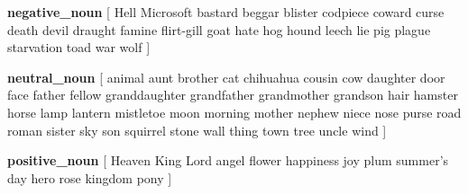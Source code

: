 \documentclass[a0paper,fontscale=0.285]{baposter} %
\begin{document}
\begin{poster}
{\textbf{negative\_noun} {[  Hell   
	 Microsoft   
	 bastard   
	 beggar   
	 blister   
	 codpiece   
	 coward   
	 curse   
	 death   
	 devil   
	 draught   
	 famine   
	 flirt-gill   
	 goat   
	 hate   
	 hog   
	 hound   
	 leech   
	 lie   
	 pig   
	 plague   
	 starvation   
	 toad   
	 war   
	 wolf  ]}

\textbf{neutral\_noun} {[  animal   
	 aunt   
	 brother   
	 cat   
	 chihuahua   
	 cousin   
	 cow   
	 daughter   
	 door   
	 face   
	 father   
	 fellow   
	 granddaughter   
	 grandfather   
	 grandmother   
	 grandson   
	 hair   
	 hamster   
	 horse   
	 lamp   
	 lantern   
	 mistletoe   
	 moon   
	 morning   
 	mother   
	 nephew   
	 niece   
	 nose   
	 purse   
	 road   
	 roman   
	 sister   
	 sky   
	 son   
	 squirrel   
	 stone   
	 wall   
	 thing   
	 town   
	 tree   
	 uncle   
	 wind ]}

\textbf{positive\_noun} {[  Heaven   
	 King   
	 Lord   
	 angel   
	 flower   
	 happiness   
	 joy   
	 plum   
	 summer's   day   
	 hero   
	 rose   
	 kingdom   
	 pony ]} }


\end{poster}
\end{document}
